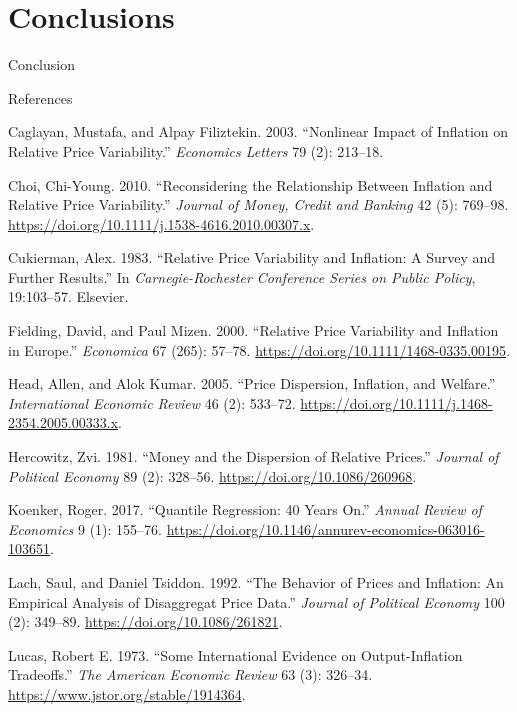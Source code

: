 \documentclass[
  ignorenonframetext,
]{beamer}
\newlength{\cslhangindent}
\newenvironment{CSLReferences}[2] %
 {\begin{list}{}{%
  \setlength{\itemindent}{0pt}
  \setlength{\leftmargin}{0pt}
  \setlength{\parsep}{0pt}
  \ifodd #1
   \setlength{\leftmargin}{\cslhangindent}
   \setlength{\itemindent}{-1\cslhangindent}
  \fi
  \setlength{\itemsep}{#2\baselineskip}}}
 {\end{list}}
\begin{document}
\section{Conclusions}\label{conclusions}

\begin{frame}{Conclusion}
\label{conclusion}
\end{frame}

\begin{frame}{References}
\label{references}
\label{refs}
\begin{CSLReferences}{1}{0}
Caglayan, Mustafa, and Alpay Filiztekin. 2003. {``Nonlinear Impact of
Inflation on Relative Price Variability.''} \emph{Economics Letters} 79
(2): 213--18.

Choi, Chi-Young. 2010. {``Reconsidering the {Relationship} Between
{Inflation} and {Relative Price Variability}.''} \emph{Journal of Money,
Credit and Banking} 42 (5): 769--98.
\url{https://doi.org/10.1111/j.1538-4616.2010.00307.x}.

Cukierman, Alex. 1983. {``Relative Price Variability and Inflation: A
Survey and Further Results.''} In \emph{Carnegie-{Rochester Conference
Series} on {Public Policy}}, 19:103--57. Elsevier.

Fielding, David, and Paul Mizen. 2000. {``Relative {Price Variability}
and {Inflation} in {Europe}.''} \emph{Economica} 67 (265): 57--78.
\url{https://doi.org/10.1111/1468-0335.00195}.

Head, Allen, and Alok Kumar. 2005. {``Price {Dispersion}, {Inflation},
and {Welfare}.''} \emph{International Economic Review} 46 (2): 533--72.
\url{https://doi.org/10.1111/j.1468-2354.2005.00333.x}.

Hercowitz, Zvi. 1981. {``Money and the {Dispersion} of {Relative
Prices}.''} \emph{Journal of Political Economy} 89 (2): 328--56.
\url{https://doi.org/10.1086/260968}.

Koenker, Roger. 2017. {``Quantile {Regression}: 40 {Years On}.''}
\emph{Annual Review of Economics} 9 (1): 155--76.
\url{https://doi.org/10.1146/annurev-economics-063016-103651}.

Lach, Saul, and Daniel Tsiddon. 1992. {``The {Behavior} of {Prices} and
{Inflation}: {An Empirical Analysis} of {Disaggregat Price Data}.''}
\emph{Journal of Political Economy} 100 (2): 349--89.
\url{https://doi.org/10.1086/261821}.

Lucas, Robert E. 1973. {``Some International Evidence on
Output-Inflation Tradeoffs.''} \emph{The American Economic Review} 63
(3): 326--34. \url{https://www.jstor.org/stable/1914364}.

\end{CSLReferences}
\end{frame}
\end{document}
